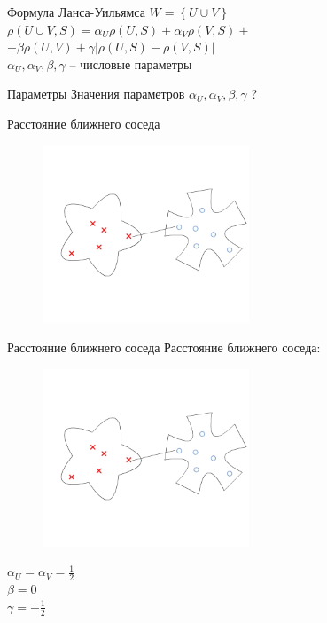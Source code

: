 \documentclass[10pt]{beamer}
\begin{document}
\begin{frame}{Формула Ланса-Уильямса}
	${ W = \left\{ U \cup V \right\} }$\\
	\bigbreak
	${\rho(U \cup V, S) = \alpha_U \rho(U, S) + \alpha_V \rho(V, S) + }$ \\
	\hspace{30mm} ${ + \beta \rho(U, V) + \gamma \vert \rho(U, S) - \rho(V, S)\vert}$\\
	\bigbreak
	${\alpha_U, \alpha_V, \beta, \gamma}$ -- числовые параметры
\end{frame}

\begin{frame}{Параметры}
	Значения параметров
	${\alpha_U, \alpha_V, \beta, \gamma}$ ?
\end{frame}

\begin{frame}{Расстояние ближнего соседа}
	\begin{figure}[htbp]
	  \includegraphics[height=150pt, keepaspectratio = true]{images/lans1}  
	\end{figure}
\end{frame}

\begin{frame}{Расстояние ближнего соседа}
	Расстояние ближнего соседа:\\
	\begin{figure}[htbp]
	  \includegraphics[height=150pt, keepaspectratio = true]{images/lans1}  
	\end{figure}
	${\alpha_U = \alpha_V = \frac{1}{2}}$ \\${\beta = 0}$ \\${\gamma = -\frac{1}{2}}$
\end{frame}
\end{document}

